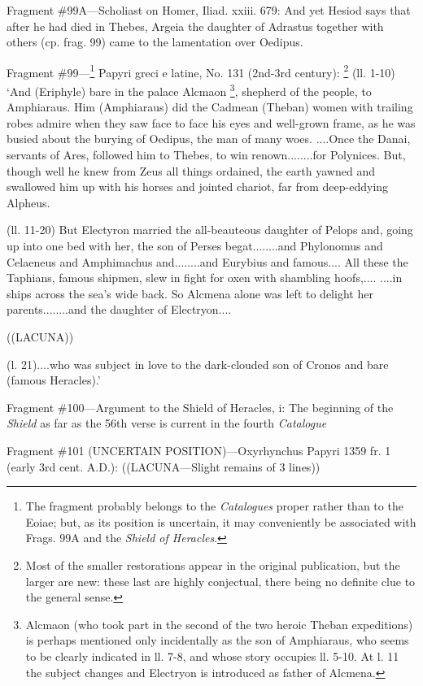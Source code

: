 Fragment \#99A—Scholiast on Homer, Iliad. xxiii. 679: And yet Hesiod says
that after he had died in Thebes, Argeia the daughter of Adrastus together with
others (cp. frag. 99) came to the lamentation over Oedipus.

Fragment \#99—\footnote{The fragment probably
belongs to the \emph{Catalogues} proper rather than to the Eoiae; but,
as its position is uncertain, it may conveniently be associated with Frags. 99A
and the \emph{Shield of Heracles}.} Papyri greci e latine, No. 131
(2nd-3rd century): \footnote{Most of the smaller
restorations appear in the original publication, but the larger are new: these
last are highly conjectual, there being no definite clue to the general sense.} (ll. 1-10) ‘And (Eriphyle)
bare in the palace Alcmaon \footnote{Alcmaon (who took part in
the second of the two heroic Theban expeditions) is perhaps mentioned only
incidentally as the son of Amphiaraus, who seems to be clearly indicated in ll.
7-8, and whose story occupies ll. 5-10. At l. 11 the subject changes and
Electryon is introduced as father of Alcmena.}, shepherd of the people, to
Amphiaraus. Him (Amphiaraus) did the Cadmean (Theban) women with trailing robes
admire when they saw face to face his eyes and well-grown frame, as he was
busied about the burying of Oedipus, the man of many woes. ....Once the Danai,
servants of Ares, followed him to Thebes, to win renown........for Polynices.
But, though well he knew from Zeus all things ordained, the earth yawned and
swallowed him up with his horses and jointed chariot, far from deep-eddying
Alpheus.

(ll. 11-20) But Electyron married the all-beauteous daughter of Pelops and,
going up into one bed with her, the son of Perses begat........and Phylonomus
and Celaeneus and Amphimachus and........and Eurybius and famous.... All these
the Taphians, famous shipmen, slew in fight for oxen with shambling hoofs,....
....in ships across the sea’s wide back. So Alcmena alone was left to
delight her parents........and the daughter of Electryon....

((LACUNA))

(l. 21)....who was subject in love to the dark-clouded son of Cronos and bare
(famous Heracles).’

Fragment \#100—Argument to the Shield of Heracles, i: The beginning of the
\emph{Shield} as far as the 56th verse is current in the fourth
\emph{Catalogue}

Fragment \#101 (UNCERTAIN POSITION)—Oxyrhynchus Papyri 1359 fr. 1 (early
3rd cent. A.D.): ((LACUNA—Slight remains of 3 lines))


